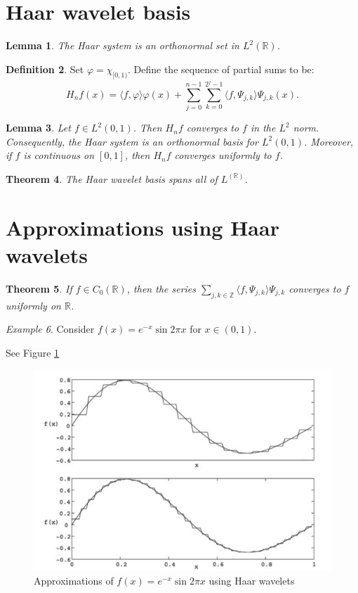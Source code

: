 \documentclass[11pt]{amsart}
\theoremstyle{theorem} %
\newtheorem{thm}{Theorem}[section] %
\newtheorem{lem}[thm]{Lemma} %
\theoremstyle{definition}                  %
\newtheorem{defn}[thm]{Definition}
\theoremstyle{example}                       %
\theoremstyle{remark}                       %
\newtheorem{exmp}[thm]{Example}  %
\numberwithin{equation}{section}
\newcommand{\R}{\mathbb{R}}
\newcommand{\Z}{\mathbb{Z}}
\begin{document}
\section{Haar wavelet basis}
\begin{lem}
	The Haar system is an orthonormal set in $ L^2(\R) $.
\end{lem}

\begin{defn}
	Set $ \varphi = \chi_{[0,1)} $. Define the sequence of partial sums to be:
	\[ H_n f(x) = \langle f, \varphi \rangle \varphi(x) + \sum_{j=0}^{n-1} \sum_{k=0}^{2^j-1} \langle f, \varPsi_{j,k} \rangle \varPsi_{j,k} (x). \]
\end{defn}

\begin{lem}
	Let $ f \in L^2(0,1) $. Then $ H_nf $ converges to $ f $ in the $ L^2 $ norm. Consequently, the Haar system is an orthonormal basis for $ L^2(0,1) $. Moreover, if $ f $ is continuous on $ [0,1] $, then $ H_nf $ converges uniformly to $ f $.
\end{lem}

\begin{thm}
	The Haar wavelet basis spans all of $ L^(\R) $.
\end{thm}

\section{Approximations using Haar wavelets}
\begin{thm}
	If $ f \in C_0(\R) $, then the series $ \sum_{j,k \in \Z} \langle f, \varPsi_{j,k} \rangle \varPsi_{j,k} $ converges to $ f $ uniformly on $ \R $.
\end{thm}

\begin{exmp}
	Consider $ f(x) = e^{-x} \sin 2\pi x $ for $ x \in (0,1) $.
	
	See Figure \ref{fig:approximations} 
\end{exmp}

\begin{figure}[h]
	\centering
	\includegraphics[width=0.7\linewidth]{img/approximations}
	\caption{Approximations of $ f(x) = e^{-x} \sin{2\pi x} $ using Haar wavelets}
	\label{fig:approximations}
\end{figure}
\end{document}
